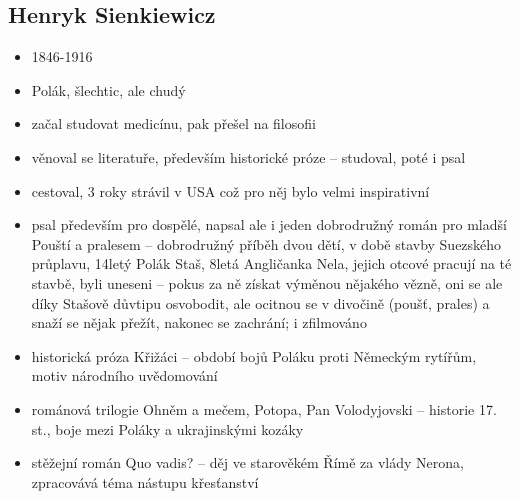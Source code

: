\documentclass{article}
\begin{document}
\subsection{Henryk Sienkiewicz}
\begin{itemize}
  \item 1846-1916
  \item Polák, šlechtic, ale chudý
  \item začal studovat medicínu, pak přešel na filosofii
  \item věnoval se literatuře, především historické próze -- studoval, poté i psal
  \item cestoval, 3 roky strávil v USA což pro něj bylo velmi inspirativní
  \item psal především pro dospělé, napsal ale i jeden dobrodružný román pro mladší Pouští a pralesem -- dobrodružný příběh dvou dětí, v době stavby Suezského průplavu, 14letý Polák Staš, 8letá Angličanka Nela, jejich otcové pracují na té stavbě, byli uneseni -- pokus za ně získat výměnou nějakého vězně, oni se ale díky Stašově důvtipu osvobodit, ale ocitnou se v divočině (poušť, prales) a snaží se nějak přežít, nakonec se zachrání; i zfilmováno
  \item historická próza Křižáci -- období bojů Poláku proti Německým rytířům, motiv národního uvědomování
  \item románová trilogie Ohněm a mečem, Potopa, Pan Volodyjovski -- historie 17. st., boje mezi Poláky a ukrajinskými kozáky
  \item stěžejní román Quo vadis? -- děj ve starověkém Římě za vlády Nerona, zpracovává téma nástupu křesťanství
\end{itemize}
\end{document}
